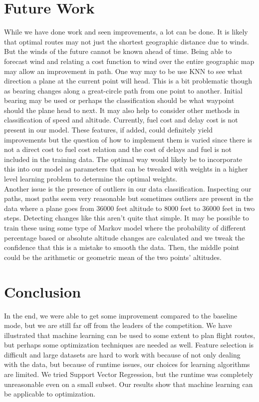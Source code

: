 \documentclass{article}[12pt]
\begin{document}
\begin{multicols}{2}
\section{Future Work}
While we have done work and seen improvements, a lot can be done. It is likely that optimal routes may not just the shortest geographic distance due to winds. But the winds of the future cannot be known ahead of time. Being able to forecast wind and relating a cost function to wind over the entire geographic map may allow an improvement in path. One way may to be use KNN to see what direction a plane at the current point will head. This is a bit problematic though as bearing changes along a great-circle path from one point to another. Initial bearing may be used or perhaps the classification should be what waypoint should the plane head to next. It may also help to consider other methods in classification of speed and altitude. Currently, fuel cost and delay cost is not present in our model. These features, if added, could definitely yield improvements but the question of how to implement them is varied since there is not a direct cost to fuel cost relation and the cost of delays and fuel is not included in the training data. The optimal way would likely be to incorporate this into our model as parameters that can be tweaked with weights in a higher level learning problem to determine the optimal weights. \\

Another issue is the presence of outliers in our data classification. Inspecting our paths, most paths seem very reasonable but sometimes outliers are present in the data where a plane goes from 36000 feet altitude to 8000 feet to 36000 feet in two steps. Detecting changes like this aren't quite that simple. It may be possible to train these using some type of Markov model where the probability of different percentage based or absolute altitude changes are calculated and we tweak the confidence that this is a mistake to smooth the data. Then, the middle point could be the arithmetic or geometric mean of the two points' altitudes.

\section{Conclusion}
In the end, we were able to get some improvement compared to the baseline mode, but we are still far off from the leaders of the competition. We have illustrated that machine learning can be used to some extent to plan flight routes, but perhaps some optimization techniques are needed as well. Feature selection is difficult and large datasets are hard to work with because of not only dealing with the data, but because of runtime issues, our choices for learning algorithms are limited. We tried Support Vector Regression, but the runtime was completely unreasonable even on a small subset. Our results show that machine learning can be applicable to optimization.


\end{multicols}
\end{document}
